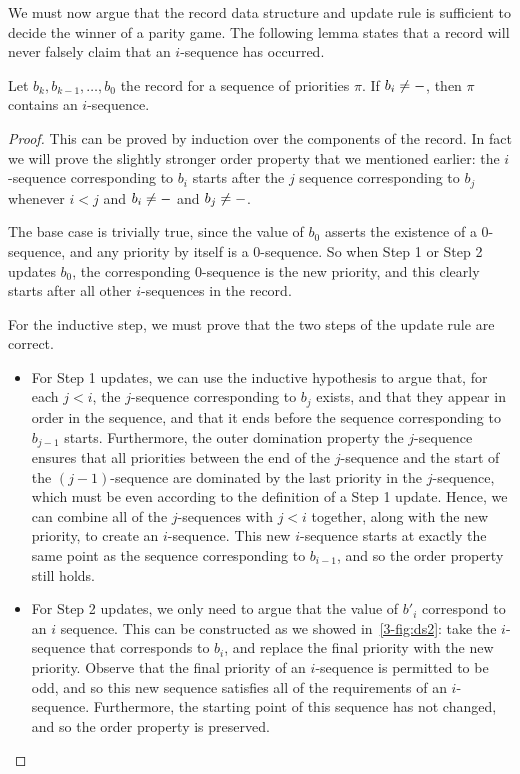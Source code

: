 We must now argue that the record data structure and update rule is sufficient
to decide the winner of a parity game. The following lemma states that a record
will never falsely claim that an $i$-sequence has occurred.

\begin{lemma}
\label{3-lem:correctness_separating_automata}
Let $b_k, b_{k-1}, \dots, b_0$ the record for a sequence of priorities $\pi$.
If $b_i \ne \mathtt{-}$, then $\pi$ contains an $i$-sequence.
\end{lemma}
\begin{proof}
This can be proved by induction over the components of the record. In fact we
will prove the slightly stronger order property that we mentioned earlier:
the $i$-sequence corresponding to
$b_i$ starts after the $j$ sequence corresponding to $b_j$ whenever $i < j$ and
$b_i \ne \mathtt{-}$ and $b_j \ne \mathtt{-}$.

The base case is trivially true, since the value of $b_0$ asserts the existence
of a 0-sequence, and any priority by itself is a $0$-sequence. So when Step 1 or
Step 2 updates $b_0$, the corresponding $0$-sequence is the new priority, and
this clearly starts after all other $i$-sequences in the record.

For the inductive step, we must prove that the two steps of the update rule are
correct. 
\begin{itemize}
\item For Step 1 updates, we can use the inductive hypothesis to argue that, for
each $j < i$, the $j$-sequence corresponding to $b_j$ exists, and that they
appear in order in the sequence, and that it ends before the sequence
corresponding to $b_{j-1}$ starts. Furthermore, the outer domination property
the $j$-sequence ensures that all priorities between the end of the
$j$-sequence and the start of the $(j-1)$-sequence are dominated by the last
priority in the $j$-sequence, which must be even according to the definition of
a Step 1 update.
Hence, we can combine all of the $j$-sequences with $j < i$ together, along with
the new priority, to create an $i$-sequence. This new $i$-sequence starts at
exactly the same point as the sequence corresponding to $b_{i-1}$, and so the
order property still holds.

\item For Step 2 updates, we only need to argue that the value of $b'_i$
correspond to an $i$ sequence. This can be constructed as we showed in~\cref{3-fig:ds2}: 
take the $i$-sequence that corresponds to $b_i$, and
replace the final priority with the new priority. Observe that the final
priority of an $i$-sequence is permitted to be odd, and so this new sequence
satisfies all of the requirements of an $i$-sequence. Furthermore, the starting
point of this sequence has not changed, and so the order property is preserved.
\end{itemize}
\end{proof}

